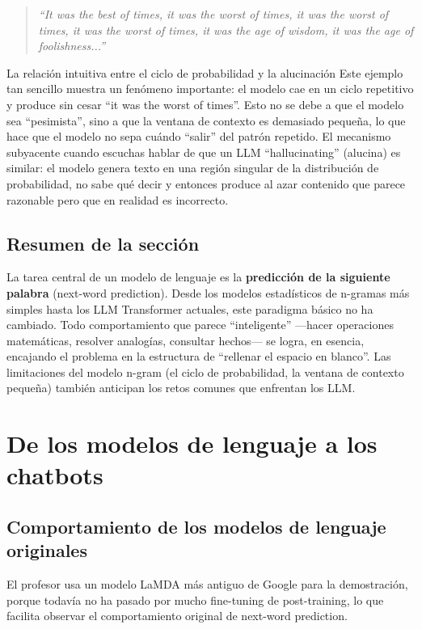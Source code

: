 \documentclass[a4paper]{article}
\begin{document}
\begin{quote}
\textit{``It was the best of times, it was the worst of times, it was the worst of times, it was the worst of times, it was the age of wisdom, it was the age of foolishness...''}
\end{quote}

\begin{warningbox}{La relación intuitiva entre el ciclo de probabilidad y la alucinación}
Este ejemplo tan sencillo muestra un fenómeno importante: el modelo cae en un ciclo repetitivo y produce sin cesar ``it was the worst of times''. Esto no se debe a que el modelo sea ``pesimista'', sino a que la ventana de contexto es demasiado pequeña, lo que hace que el modelo no sepa cuándo ``salir'' del patrón repetido. El mecanismo subyacente cuando escuchas hablar de que un LLM ``hallucinating'' (alucina) es similar: el modelo genera texto en una región singular de la distribución de probabilidad, no sabe qué decir y entonces produce al azar contenido que parece razonable pero que en realidad es incorrecto.
\end{warningbox}

\subsection{Resumen de la sección}

La tarea central de un modelo de lenguaje es la \textbf{predicción de la siguiente palabra} (next-word prediction). Desde los modelos estadísticos de n-gramas más simples hasta los LLM Transformer actuales, este paradigma básico no ha cambiado. Todo comportamiento que parece ``inteligente'' —hacer operaciones matemáticas, resolver analogías, consultar hechos— se logra, en esencia, encajando el problema en la estructura de ``rellenar el espacio en blanco''. Las limitaciones del modelo n-gram (el ciclo de probabilidad, la ventana de contexto pequeña) también anticipan los retos comunes que enfrentan los LLM.
\section{De los modelos de lenguaje a los chatbots}

\subsection{Comportamiento de los modelos de lenguaje originales}

El profesor usa un modelo LaMDA más antiguo de Google para la demostración, porque todavía no ha pasado por mucho fine-tuning de post-training, lo que facilita observar el comportamiento original de next-word prediction.
\end{document}

